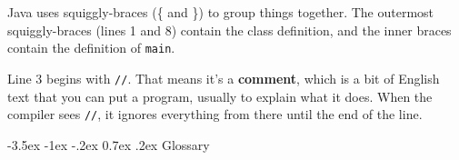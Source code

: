 \documentclass{book}
\makeatletter
\renewcommand{\section}{\@startsection 
    {section} {1} {0mm}%
    {-3.5ex \@plus -1ex \@minus -.2ex}%
    {0.7ex \@plus.2ex}%
    {\normalfont\Large\bfseries}}
\makeatother
\begin{document}
Java uses squiggly-braces (\{ and \}) to group things together.  The
outermost squiggly-braces (lines 1 and 8) contain the class
definition, and the inner braces contain the definition of {\tt main}.


Line 3 begins with {\tt //}.  That means it's 
a {\bf comment}, which is a bit of
English text that you can put a program,
usually to explain what it does.  When the compiler
sees {\tt //}, it ignores everything from there until the end
of the line.


\section{Glossary}
\end{document}
